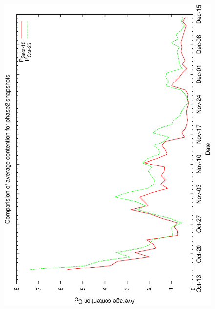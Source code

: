 \begin{figure}[h]
\begin{center}
{   \includegraphics[scale=0.25, angle=-90]{figures/c60_odb_cav.eps}
  }
\end{center}
\end{figure}
